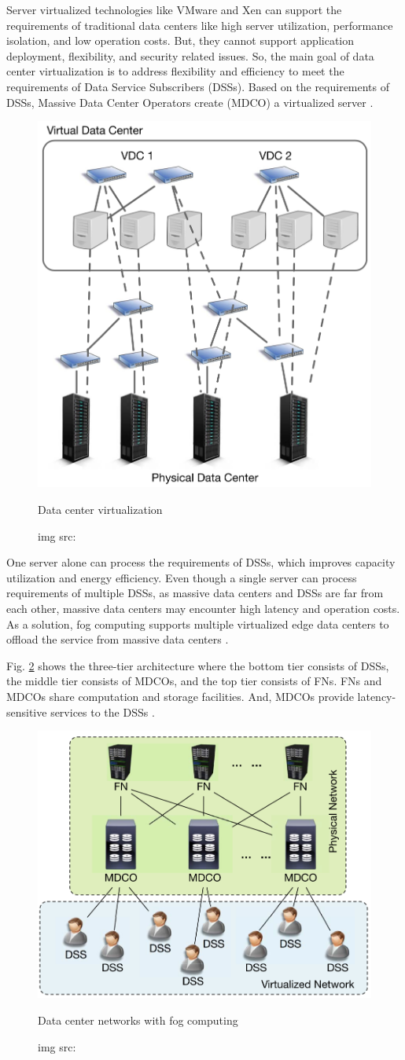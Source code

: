 Server virtualized technologies like VMware and Xen can support the requirements of traditional data centers like high server utilization, performance isolation, and low operation costs. But, they cannot support application deployment, flexibility, and security related issues. So, the main goal of data center virtualization is to address flexibility and efficiency to meet the requirements of Data Service Subscribers (DSSs). Based on the requirements of DSSs, Massive Data Center Operators create (MDCO) a virtualized server \cite{mukherjee2018survey}. 

\begin{figure}[H]
    \centering
    \includegraphics[width=.5\linewidth]{image/Data center virtualization.png}
    \caption{Data center virtualization}
    \caption*{img src: \cite{mukherjee2018survey}}
    \label{fig:data center virtualization}
\end{figure}

One server alone can process the requirements of DSSs, which improves capacity utilization and energy efficiency. Even though a single server can process requirements of multiple DSSs, as massive data centers and DSSs are far from each other, massive data centers may encounter high latency and operation costs. As a solution, fog computing supports multiple virtualized edge data centers to offload the service from massive data centers \cite{mukherjee2018survey}. \par

Fig. \ref{fig:data center networks with fog computing} shows the three-tier architecture where the bottom tier consists of DSSs, the middle tier consists of MDCOs, and the top tier consists of FNs. FNs and MDCOs share computation and storage facilities. And, MDCOs provide latency-sensitive services to the DSSs \cite{mukherjee2018survey}.

\begin{figure}[H]
    \centering
    \includegraphics[width=.5\linewidth]{image/Data center networks with fog computing.png}
    \caption{Data center networks with fog computing}
    \caption*{img src: \cite{mukherjee2018survey}}
    \label{fig:data center networks with fog computing}
\end{figure}